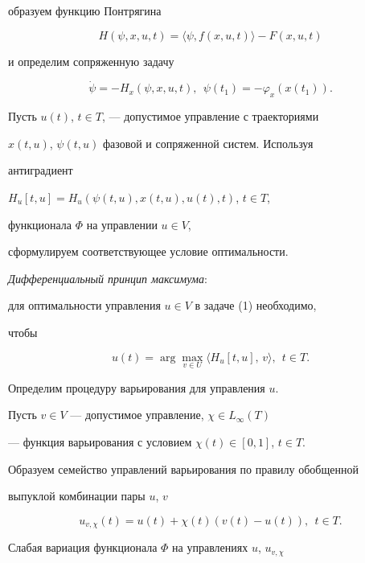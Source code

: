образуем функцию Понтрягина


$$


H(\psi, x, u, t) = \langle \psi, f(x, u, t)\rangle - F(x, u, t)


$$


и определим сопряженную задачу


$$


\Dot{\psi} = - H_{x}(\psi, x, u, t), 


\ \ \psi(t_{1}) = - \varphi_{x}(x(t_{1})).


$$


Пусть $u(t)$, $t \in T$, --- допустимое управление с траекториями


$x(t,u)$, $\psi(t,u)$ фазовой и сопряженной систем. Используя


антиградиент 


$H_{u}[t,u]=H_u(\psi(t,u),x(t,u),u(t),t)$, $t\in T$,


функционала $\Phi$ на управлении $u \in V$, 


сформулируем соответствующее условие оптимальности.


\medskip





{\it Дифференциальный принцип максимума}:


для оптимальности управления $ u \in V$ в задаче (1) необходимо,


чтобы


$$


u(t) = \arg\max_{v \in U} \langle H_{u}[t,u],\,v\rangle,\ \ t \in T.


$$





Определим процедуру варьирования для управления $u$.


Пусть $v \in V$ --- допустимое управление, $\chi \in L_{\infty}(T)$


--- функция варьирования с условием $\chi(t) \in [0, 1]$, $t \in T$.


Образуем семейство управлений варьирования по правилу обобщенной


выпуклой комбинации пары $u$, $v$


\begin{equation}


u_{v, \chi}(t) = u(t) + \chi(t)(v(t) - u(t)),\ \ t \in T.


\end{equation}


Слабая вариация функционала $\Phi$ на управлениях $u$, $u_{v, \chi}$


